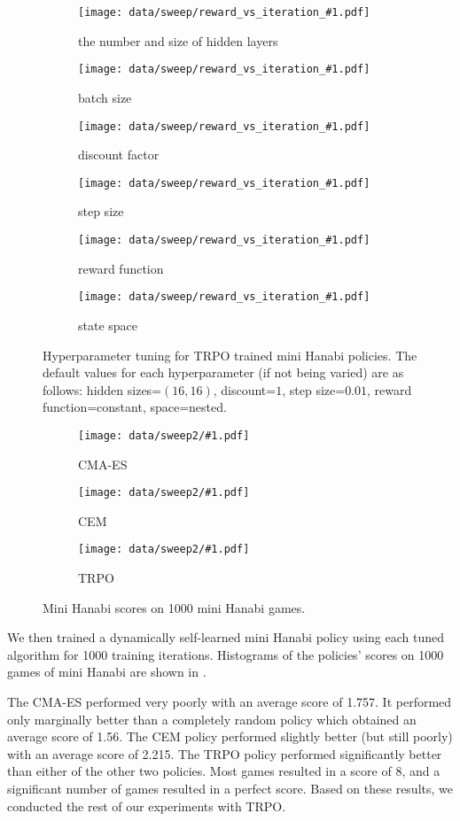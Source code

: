 \begin{figure}[ht]
  \newcommand{\hyperparamsubfig}[3]{%
    \begin{subfigure}[t]{0.32\textwidth}
      \centering
      \texttt{[image: data/sweep/reward\_vs\_iteration\_\#1.pdf]}
      \caption{#2}\label{fig:#3}
    \end{subfigure}
  }

  \centering

  \hyperparamsubfig{hidden_sizes}{the number and size of hidden layers}{}
  \hyperparamsubfig{batch_size}{batch size}{}
  \hyperparamsubfig{discount}{discount factor}{}

  \hyperparamsubfig{step_size}{step size}{}
  \hyperparamsubfig{reward}{reward function}{}
  \hyperparamsubfig{space}{state space}{}

  \caption{
    Hyperparameter tuning for TRPO trained mini Hanabi policies. The default
    values for each hyperparameter (if not being varied) are as follows: hidden
    sizes=$(16, 16)$, discount=$1$, step size=$0.01$, reward function=constant,
    space=nested.
  }\label{fig:trpo-tuning}
\end{figure}

\begin{figure}[ht]
  \newcommand{\algosubfig}[3]{%
    \begin{subfigure}[b]{0.32\textwidth}
      \centering
      \texttt{[image: data/sweep2/\#1.pdf]}
      \caption{#2}\label{fig:#3}
    \end{subfigure}
  }

  \centering
  \algosubfig{CMA-ES}{CMA-ES}{cmaes}
  \algosubfig{CEM}{CEM}{cem}
  \algosubfig{TRPO}{TRPO}{trpo}
  \caption{Mini Hanabi scores on 1000 mini Hanabi games.}\label{fig:algos}
\end{figure}

We then trained a dynamically self-learned mini Hanabi policy using each
tuned algorithm for 1000 training iterations. Histograms of the policies'
scores on 1000 games of mini Hanabi are shown in .

The CMA-ES performed very poorly with an average score of 1.757. It performed
only marginally better than a completely random policy which obtained an
average score of 1.56.
%
The CEM policy performed slightly better (but still poorly) with an average
score of 2.215.
%
The TRPO policy performed significantly better than either of the other two
policies. Most games resulted in a score of 8, and a significant number of
games resulted in a perfect score.
%
Based on these results, we conducted the rest of our experiments with TRPO.

